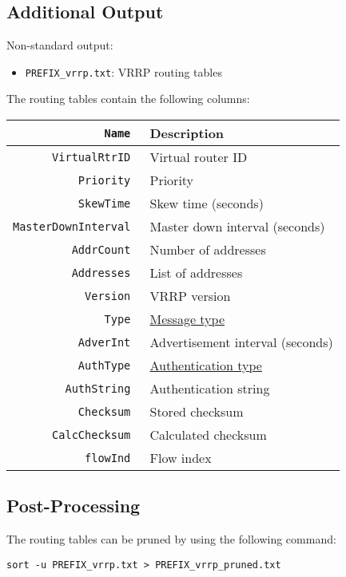 \documentclass[documentation]{subfiles}
\begin{document}
\subsection{Additional Output}
Non-standard output:
\begin{itemize}
    \item {\tt PREFIX\_vrrp.txt}: VRRP routing tables
\end{itemize}

The routing tables contain the following columns:
\begin{longtable}{>{\tt}rl}
    \toprule
    {\bf Name} & {\bf Description}\\
    \midrule\endhead%
    VirtualRtrID          & Virtual router ID\\
    Priority              & Priority\\
    SkewTime              & Skew time (seconds)\\
    MasterDownInterval    & Master down interval (seconds)\\
    AddrCount             & Number of addresses\\
    Addresses             & List of addresses\\
    Version               & VRRP version\\
    Type                  & \hyperref[vrrpType]{Message type}\\
    AdverInt              & Advertisement interval (seconds)\\
    AuthType              & \hyperref[vrrpAuthType]{Authentication type}\\
    AuthString            & Authentication string\\
    Checksum              & Stored checksum\\
    CalcChecksum          & Calculated checksum\\
    flowInd               & Flow index\\
    \bottomrule
\end{longtable}

\subsection{Post-Processing}
The routing tables can be pruned by using the following command:
\begin{verbatim}
sort -u PREFIX_vrrp.txt > PREFIX_vrrp_pruned.txt
\end{verbatim}
\end{document}
